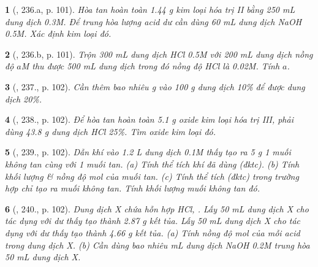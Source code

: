 \documentclass{article}
\newtheorem{baitoan}{}
\begin{document}
\begin{baitoan}[\cite{Nguyen_Buu_Can_500_BT_Hoa_Hoc_THCS}, 236.a, p. 101]
	Hòa tan hoàn toàn {\rm1.44 g} kim loại hóa trị II bằng {\rm250 mL} dung dịch {\rm{} 0.3M}. Để trung hòa lượng acid dư cần dùng {\rm60 mL} dung dịch {\rm NaOH 0.5M}. Xác định kim loại đó.
\end{baitoan}

\begin{baitoan}[\cite{Nguyen_Buu_Can_500_BT_Hoa_Hoc_THCS}, 236.b, p. 101]
	Trộn {\rm300 mL} dung dịch {\rm HCl 0.5M} với {\rm200 mL} dung dịch {\rm{}} nồng độ $a${\rm M} thu được {\rm500 mL} dung dịch trong đó nồng độ {\rm HCl} là {\rm0.02M}. Tính $a$.
\end{baitoan}

\begin{baitoan}[\cite{Nguyen_Buu_Can_500_BT_Hoa_Hoc_THCS}, 237., p. 102]
	Cần thêm bao nhiêu {\rm g } vào {\rm100 g} dung dịch {\rm{} 10\%} để được dung dịch {\rm{} 20\%}.
\end{baitoan}

\begin{baitoan}[\cite{Nguyen_Buu_Can_500_BT_Hoa_Hoc_THCS}, 238., p. 102]
	Để hòa tan hoàn toàn {\rm5.1 g} oxide kim loại hóa trị III, phải dùng {\rm43.8 g} dung dịch {\rm HCl 25\%}. Tìm oxide kim loại đó.
\end{baitoan}

\begin{baitoan}[\cite{Nguyen_Buu_Can_500_BT_Hoa_Hoc_THCS}, 239., p. 102]
	Dẫn khí {\rm{}} vào {\rm1.2 L} dung dịch {\rm{} 0.1M} thấy tạo ra {\rm5 g} 1 muối không tan cùng với 1 muối tan. (a) Tính thể tích khí {\rm{}} đã dùng (đktc). (b) Tính khối lượng \& nồng độ mol của muối tan. (c) Tính thể tích {\rm{}} (đktc) trong trường hợp chỉ tạo ra muối không tan. Tính khối lượng muối không tan đó.
\end{baitoan}

\begin{baitoan}[\cite{Nguyen_Buu_Can_500_BT_Hoa_Hoc_THCS}, 240., p. 102]
	Dung dịch X chứa hỗn hợp {\rm HCl, }. Lấy {\rm50 mL} dung dịch X cho tác dụng với {\rm{}} dư thấy tạo thành {\rm2.87 g} kết tủa. Lấy {\rm50 mL} dung dịch X cho tác dụng với {\rm{}} dư thấy tạo thành {\rm4.66 g} kết tủa. (a) Tính nồng độ mol của mỗi acid trong dung dịch X. (b) Cần dùng bao nhiêu {\rm mL} dung dịch {\rm NaOH 0.2M} trung hòa {\rm50 mL} dung dịch X.
\end{baitoan}
\end{document}
